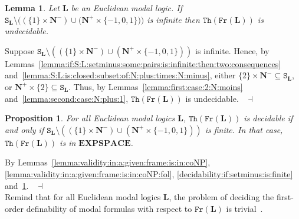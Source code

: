 \documentclass[draft]{article}
\newtheorem{lemma}{Lemma}
\newtheorem{proposition}{Proposition}
\newenvironment{proof}{{\bf Proof:}}{~$\dashv$\\}
\def\Th{\mathtt{Th}}
\def\Fr{\mathtt{Fr}}
\def\EXPSPACE{\mathbf{EXPSPACE}}
\def\L{\mathbf{L}}
\begin{document}
%
%
\begin{lemma}\label{lemma:infinite:undecidable:case}
%
%
Let $\L$ be an Euclidean modal logic.
If $\mathtt{S}_{\L}{\setminus}((\{1\}{\times}\mathbf{N}^{-}){\cup}(\mathbf{N}^{+}{\times}\{{-}1,
%
%
%
%
%
%
%
%
%
%
%
%
$\linebreak$
%
%
%
%
%
%
%
%
%
%
%
%
0,1\}))$ is infinite then $\Th(\Fr(\L))$ is undecidable.
%
%
\end{lemma}
%
%
\begin{proof}
%
%
Suppose $\mathtt{S}_{\L}{\setminus}((\{1\}{\times}\mathbf{N}^{-}){\cup}(\mathbf{N}^{+}{\times}\{{-}1,0,1\}))$ is infinite.
Hence, by Lemmas~\ref{lemma:if:S:L:setminus:some:pairs:is:infinite:then:two:consequences} and~\ref{lemma:S:L:is:closed:subset:of:N:plus:times:N:minus}, either $\{2\}{\times}\mathbf{N}^{-}{\subseteq}\mathtt{S}_{\L}$, or $\mathbf{N}^{+}{\times}\{2\}{\subseteq}\mathtt{S}_{\L}$.
Thus, by Lemmas~\ref{lemma:first:case:2:N:moins} and~\ref{lemma:second:case:N:plus:1}, $\Th(\Fr(\L))$ is undecidable.
%
%
\medskip
%
%
\end{proof}
%
%
\begin{proposition}\label{proposition:beta:beta:nsc:for:decidability:theory}
%
%
For all Euclidean modal logics $\L$, $\Th(\Fr(\L))$ is decidable if and only if $\mathtt{S}_{\L}{\setminus}((\{1\}{\times}\mathbf{N}^{-}){\cup}(\mathbf{N}^{+}{\times}\{{-}1,0,1\}))$ is finite.
In that case, $\Th(\Fr(\L))$ is in $\EXPSPACE$.
%
%
\end{proposition}
%
%
\begin{proof}
%
%
By Lemmas~\ref{lemma:validity:in:a:given:frame:is:in:coNP}, \ref{lemma:validity:in:a:given:frame:is:in:coNP:fol}, \ref{decidability:if:setminus:is:finite} and~\ref{lemma:infinite:undecidable:case}.
%
%
\medskip
%
%
\end{proof}
%
%
%
%
%
%
%
%
%
%
%
%
%
%
%
%
%
%
%
%
%
%
%
%
%
%
%
%
%
%
%
%
%
%
%
%
%
%
Remind that for all Euclidean modal logics $\L$, the problem of deciding the first-order definability of modal formulas with respect to $\Fr(\L)$ is trivial~\cite{Balbiani:Georgiev:Tinchev:2018}.
\end{document}
